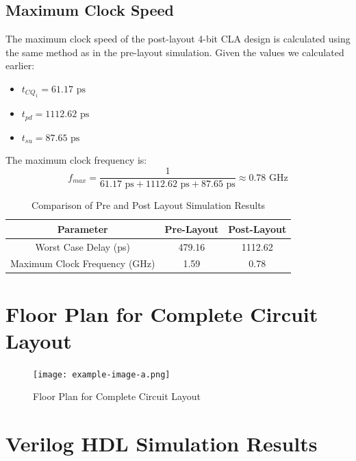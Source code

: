 \documentclass[conference]{IEEEtran}
\begin{document}
\subsection{Maximum Clock Speed}
The maximum clock speed of the post-layout 4-bit CLA design is calculated using the same method as in the pre-layout simulation. Given the values we calculated earlier:
\begin{itemize}
    \item $t_{CQ_1} = 61.17 \text{ ps}$
    \item $t_{pd} = 1112.62 \text{ ps}$
    \item $t_{su} = 87.65 \text{ ps}$
\end{itemize}

The maximum clock frequency is:
\begin{equation}
    f_{max} = \frac{1}{61.17 \text{ ps} + 1112.62 \text{ ps} + 87.65 \text{ ps}} \approx 0.78 \text{ GHz}
\end{equation}

\begin{table}[H]
    \centering
    \caption{Comparison of Pre and Post Layout Simulation Results}
    \begin{tabular}{|c|c|c|}
    \hline
    \rowcolor{cyan!10}
    \textbf{Parameter} & \textbf{Pre-Layout} & \textbf{Post-Layout} \\ \hline
    Worst Case Delay (ps) & 479.16 & 1112.62 \\ \hline
    Maximum Clock Frequency (GHz) & 1.59 & 0.78 \\ \hline
    \end{tabular}
    \label{tab:comparison}
\end{table}

\section{Floor Plan for Complete Circuit Layout}

\begin{figure}[h]
    \centering
    \texttt{[image: example-image-a.png]}
    \caption{Floor Plan for Complete Circuit Layout}
    \label{fig:floorplan}
\end{figure}

\section{Verilog HDL Simulation Results}
\end{document}

